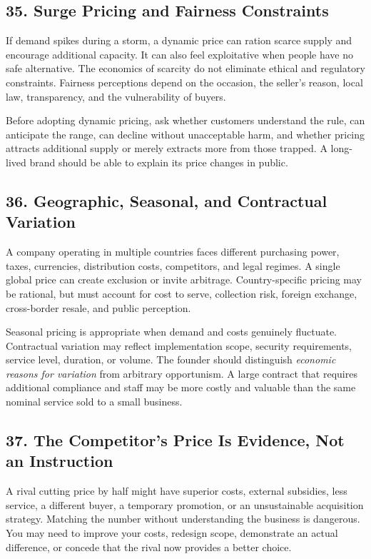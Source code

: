 \subsection*{35. Surge Pricing and Fairness Constraints}

If demand spikes during a storm, a dynamic price can ration scarce supply and encourage additional capacity. It can also feel exploitative when people have no safe alternative. The economics of scarcity do not eliminate ethical and regulatory constraints. Fairness perceptions depend on the occasion, the seller's reason, local law, transparency, and the vulnerability of buyers.

Before adopting dynamic pricing, ask whether customers understand the rule, can anticipate the range, can decline without unacceptable harm, and whether pricing attracts additional supply or merely extracts more from those trapped. A long-lived brand should be able to explain its price changes in public.

\subsection*{36. Geographic, Seasonal, and Contractual Variation}

A company operating in multiple countries faces different purchasing power, taxes, currencies, distribution costs, competitors, and legal regimes. A single global price can create exclusion or invite arbitrage. Country-specific pricing may be rational, but must account for cost to serve, collection risk, foreign exchange, cross-border resale, and public perception.

Seasonal pricing is appropriate when demand and costs genuinely fluctuate. Contractual variation may reflect implementation scope, security requirements, service level, duration, or volume. The founder should distinguish \emph{economic reasons for variation} from arbitrary opportunism. A large contract that requires additional compliance and staff may be more costly and valuable than the same nominal service sold to a small business.

\subsection*{37. The Competitor's Price Is Evidence, Not an Instruction}

A rival cutting price by half might have superior costs, external subsidies, less service, a different buyer, a temporary promotion, or an unsustainable acquisition strategy. Matching the number without understanding the business is dangerous. You may need to improve your costs, redesign scope, demonstrate an actual difference, or concede that the rival now provides a better choice.

